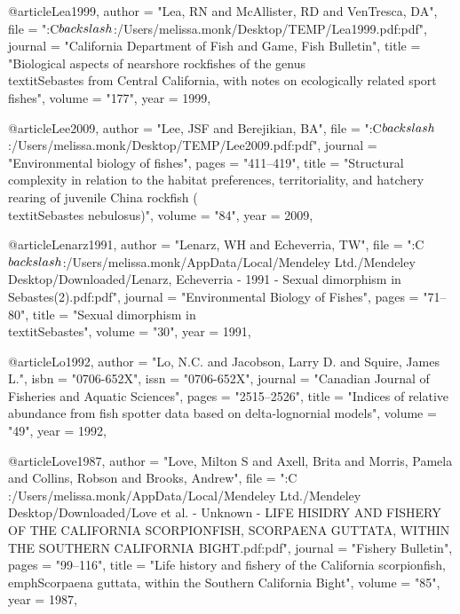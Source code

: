@article{Lea1999,
    author = "{Lea, RN and McAllister, RD and VenTresca, DA}",
    file = "{:C$\\backslash$:/Users/melissa.monk/Desktop/TEMP/Lea1999.pdf:pdf}",
    journal = "{California Department of Fish and Game, Fish Bulletin}",
    title = "{{Biological aspects of nearshore rockfishes of the genus \\textit{{Sebastes}} from {Central} {California}, with notes on ecologically related sport fishes}}",
    volume = "{177}",
    year = 1999,
}

@article{Lee2009,
    author = "{Lee, JSF and Berejikian, BA}",
    file = "{:C$\\backslash$:/Users/melissa.monk/Desktop/TEMP/Lee2009.pdf:pdf}",
    journal = "{Environmental biology of fishes}",
    pages = "{411--419}",
    title = "{{Structural complexity in relation to the habitat preferences, territoriality, and hatchery rearing of juvenile China rockfish (\\textit{{Sebastes} nebulosus})}}",
    volume = "{84}",
    year = 2009,
}

@article{Lenarz1991,
    author = "{Lenarz, WH and Echeverria, TW}",
    file = "{:C$\\backslash$:/Users/melissa.monk/AppData/Local/Mendeley Ltd./Mendeley Desktop/Downloaded/Lenarz, Echeverria - 1991 - Sexual dimorphism in Sebastes(2).pdf:pdf}",
    journal = "{Environmental Biology of Fishes}",
    pages = "{71--80}",
    title = "{{Sexual dimorphism in \\textit{{Sebastes}}}}",
    volume = "{30}",
    year = 1991,
}

@article{Lo1992,
    author = "{Lo, N.C. and Jacobson, Larry D. and Squire, James L.}",
    isbn = "{0706-652X}",
    issn = "{0706-652X}",
    journal = "{Canadian Journal of Fisheries and Aquatic Sciences}",
    pages = "{2515--2526}",
    title = "{{Indices of relative abundance from fish spotter data based on delta-lognornial models}}",
    volume = "{49}",
    year = 1992,
}

@article{Love1987,
    author = "{Love, Milton S and Axell, Brita and Morris, Pamela and Collins, Robson and Brooks, Andrew}",
    file = "{:C\\:/Users/melissa.monk/AppData/Local/Mendeley Ltd./Mendeley Desktop/Downloaded/Love et al. - Unknown - LIFE HISIDRY AND FISHERY OF THE CALIFORNIA SCORPIONFISH, SCORPAENA GUTTATA, WITHIN THE SOUTHERN CALIFORNIA BIGHT.pdf:pdf}",
    journal = "{Fishery Bulletin}",
    pages = "{99--116}",
    title = "{{Life history and fishery of the California scorpionfish, \\emph{Scorpaena guttata}, within the Southern California Bight}}",
    volume = "{85}",
    year = 1987,
}

